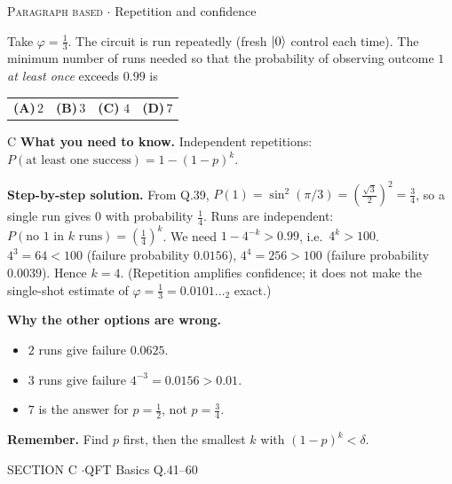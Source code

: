 \documentclass[11pt,a4paper]{article}
\newcommand{\optlabel}[1]{\textbf{(#1)}}
\newcommand{\correctlabel}[1]{\textcolor{okgreen}{\textbf{(#1)}\,\ding{51}}}
\newenvironment{qitem}[1]{\begin{list}{}{\setlength{\leftmargin}{3.3em}\setlength{\labelwidth}{3.1em}%
  \setlength{\labelsep}{0.2em}\setlength{\topsep}{3pt}\setlength{\parsep}{3pt}}\item[\textbf{Q.#1}\hfill]}{\end{list}}
\newcommand{\qsep}{\par\vspace{2pt}{\color{black!15}\hrule}\vspace{4pt}}
\newcommand{\qmeta}[2]{{\footnotesize\color{black!60}\textsc{#1} \;$\cdot$\; #2}\par}
\begin{document}
\begin{qitem}{40}
\qmeta{Paragraph based}{Repetition and confidence}
Take $\varphi = \frac13$. The circuit is run repeatedly (fresh $\ket0$ control each time). The minimum number of runs
needed so that the probability of observing outcome $1$ \emph{at least once} exceeds $0.99$ is
\par\smallskip\noindent\begin{tabularx}{\linewidth}{@{}*{4}{L}@{}}
\optlabel{A}\,$2$ & \optlabel{B}\,$3$ & \correctlabel{C}\,$4$ & \optlabel{D}\,$7$
\end{tabularx}
\end{qitem}
\begin{solbox}{C}
\textbf{\color{brand}What you need to know.} Independent repetitions: $P(\text{at least one success}) = 1 - (1-p)^k$.

\textbf{\color{brand}Step-by-step solution.} From Q.39, $P(1) = \sin^2(\pi/3) = \left(\frac{\sqrt3}{2}\right)^2 = \frac34$, so a single run gives 0 with probability $\frac14$.
Runs are independent: $P(\text{no } 1 \text{ in } k \text{ runs}) = \left(\frac14\right)^k$. We need $1 - 4^{-k} > 0.99$, i.e.\ $4^k > 100$.
$4^3 = 64 < 100$ (failure probability $0.0156$), $4^4 = 256 > 100$ (failure probability $0.0039$). Hence $k = 4$.
(Repetition amplifies confidence; it does not make the single-shot estimate of $\varphi = \frac13 = 0.0101\ldots_2$ exact.)

\textbf{\color{brand}Why the other options are wrong.}
\begin{itemize}[leftmargin=2.4em, itemsep=1pt, topsep=2pt]
\item[\textbf{(A)}] $2$ runs give failure $0.0625$.
\item[\textbf{(B)}] $3$ runs give failure $4^{-3} = 0.0156 > 0.01$.
\item[\textbf{(D)}] $7$ is the answer for $p = \frac12$, not $p = \frac34$.
\end{itemize}
\textbf{\color{brand}Remember.} Find $p$ first, then the smallest $k$ with $(1-p)^k < \delta$.
\end{solbox}
\qsep

\newpage

\begin{sectionbanner}SECTION C \enspace$\cdot$\enspace QFT Basics \hfill Q.41--60\end{sectionbanner}
\end{document}
